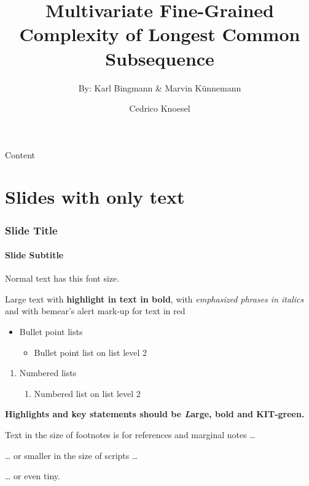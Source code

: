 \documentclass[
 UKenglish%
 ]{beamer}%
\author[C.\, Knoesel]{Cedrico Knoesel}
\title[Multivariate Fine-Grained Complexity of LCS]{Multivariate Fine-Grained Complexity of Longest Common Subsequence}
\subtitle{By: Karl Bingmann \& Marvin Künnemann}
\institute[]{}
\begin{document}



\frame[KITgreenhalf]{\titlepage}



\begin{frame}[KITgreenTOC,t]{\fontsize{10}{10}\selectfont\textcolor{KITwhite}{Content}\hfill{}\hbox{\scalebox{0.72}{\KITlogo}}\kern3mm}
  \vspace*{-5mm}%
  \tableofcontents
\end{frame}







\section{Slides with only text}

\begin{frame}[c]%
  \frametitle{Slide Title}
  \framesubtitle{Slide Subtitle}

  Normal text has this font size.

  {\large Large text with \textbf{highlight in text in bold}, with \emph{emphasized phrases in italics} and with \alert{bemear's alert mark-up for text in red}\par}
  
  \begin{itemize}
  \item Bullet point lists
    \begin{itemize}
    \item Bullet point list on list level 2
    \end{itemize}
  \end{itemize}
  \begin{enumerate}
  \item Numbered lists
    \begin{enumerate}
    \item Numbered list on list level 2
    \end{enumerate}
  \end{enumerate}

  {\Large\bfseries\color{KITgreen}Highlights and key statements should be \emph{L}arge, bold and KIT-green.\par}

  {\footnotesize Text in the size of footnotes is for references and marginal notes \dots{}\par}

  {\scriptsize \dots{} or smaller in the size of scripts \dots{}\par}

  {\tiny \dots{} or even tiny.\par}
\end{frame}
\end{document}
